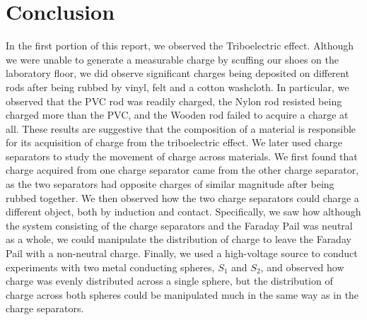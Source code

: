 \documentclass[oneside,12pt]{amsart}
\begin{document}
\section{Conclusion}
\indent In the first portion of this report, we observed the Triboelectric effect. Although we were unable to generate a measurable charge by scuffing our shoes on the laboratory floor, we did observe significant charges being deposited on different rods after being rubbed by vinyl, felt and a cotton washcloth. In particular, we observed that the PVC rod was readily charged, the Nylon rod resisted being charged more than the PVC, and the Wooden rod failed to acquire a charge at all. These results are suggestive that the composition of a material is responsible for its acquisition of charge from the triboelectric effect. We later used charge separators to study the movement of charge across materials. We first found that charge acquired from one charge separator came from the other charge separator, as the two separators had opposite charges of similar magnitude after being rubbed together. We then observed how the two charge separators could charge a different object, both by induction and contact. Specifically, we saw how although the system consisting of the charge separators and the Faraday Pail was neutral as a whole, we could manipulate the distribution of charge to leave the Faraday Pail with a non-neutral charge. Finally, we used a high-voltage source to conduct experiments with two metal conducting spheres, $S_1$ and $S_2$, and observed how charge was evenly distributed across a single sphere, but the distribution of charge across both spheres could be manipulated much in the same way as in the charge separators.
\newpage

\printbibliography

	
\end{document}
